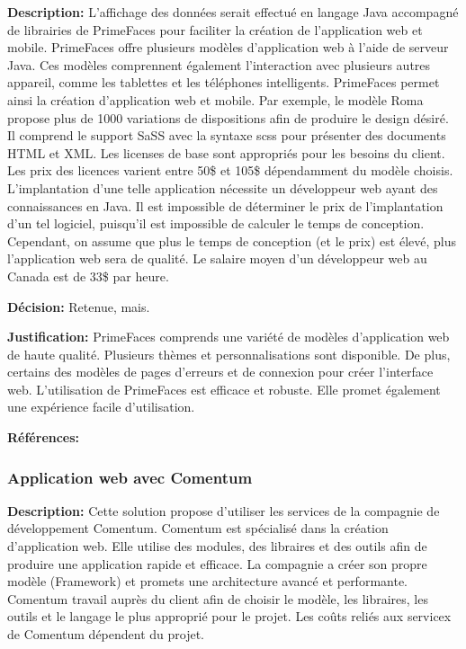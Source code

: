 \textbf{Description:} L'affichage des données serait effectué en langage Java accompagné de librairies de PrimeFaces pour faciliter la création de l'application web et mobile. PrimeFaces offre plusieurs modèles d'application web à l'aide de serveur Java. Ces modèles comprennent également l'interaction avec plusieurs autres appareil, comme les tablettes et les téléphones intelligents. PrimeFaces permet ainsi la création d'application web et mobile. Par exemple, le modèle Roma propose plus de 1000 variations de dispositions afin de produire le design désiré. Il comprend le support SaSS avec la syntaxe scss pour présenter des documents HTML et XML. Les licenses de base sont appropriés pour les besoins du client. Les prix des licences varient entre 50\$ et 105\$ dépendamment du modèle choisis. L'implantation d'une telle application nécessite un développeur web ayant des connaissances en Java. Il est impossible de déterminer le prix de l'implantation d'un tel logiciel, puisqu'il est impossible de calculer le temps de conception. Cependant, on assume que plus le temps de conception (et le prix) est élevé, plus l'application web sera de qualité. Le salaire moyen d'un développeur web au Canada est de 33\$ par heure.

\textbf{Décision:} Retenue, mais.

\textbf{Justification:} PrimeFaces comprends une variété de modèles d'application web de haute qualité. Plusieurs thèmes et personnalisations sont disponible. De plus, certains des modèles de pages d'erreurs et de connexion pour créer l'interface web. L'utilisation de PrimeFaces est efficace et robuste. Elle promet également une expérience facile d'utilisation.

\textbf{Références:} \cite{PF} \cite{PF_Roma} \cite{PF_exemple} \cite{Dev_salary}

\subsubsection{Application web avec Comentum}

\textbf{Description:} Cette solution propose d'utiliser les services de la compagnie de développement Comentum. Comentum est spécialisé dans la création d'application web. Elle utilise des modules, des libraires et des outils afin de produire une application rapide et efficace. La compagnie a créer son propre modèle (Framework) et promets une architecture avancé et performante. Comentum travail auprès du client afin de choisir le modèle, les libraires, les outils et le langage le plus approprié pour le projet. Les coûts reliés aux servicex de Comentum dépendent du projet.

